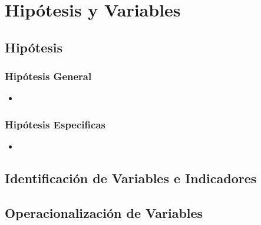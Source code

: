 	\chapter{Hipótesis y Variables}
		\section{Hipótesis}
			\subsection{Hipótesis General}
				\begin{itemize}
				\item 
				\end{itemize}	
			\subsection{Hipótesis Especificas}
				\begin{itemize}
				\item 
				\end{itemize}	
		\section{Identificación de Variables e Indicadores}
		\section{Operacionalización de Variables}
				
	
		
		
		